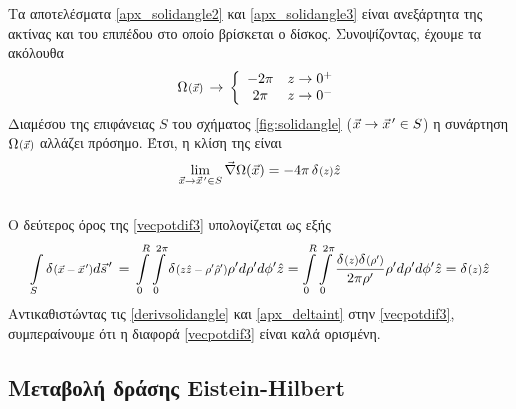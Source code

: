 Τα αποτελέσματα \eqref{apx_solidangle2} και \eqref{apx_solidangle3} είναι ανεξάρτητα της ακτίνας και του επιπέδου στο οποίο βρίσκεται ο δίσκος. 
Συνοψίζοντας, έχουμε τα ακόλουθα
\begin{equation*}
    \scafun{\Omega}{\vec{x}} \,\rightarrow\, \left\{\begin{array}{cc} -2\pi & z \rightarrow 0^+\\ 2\pi & z\rightarrow0^-
            \end{array} \right. 
\end{equation*}
Διαμέσου της επιφάνειας $S$ του σχήματος \ref{fig:solidangle} ($\vec{x}\rightarrow\pvec{x}'\in S$) η συνάρτηση $\scafun{\Omega}{\vec{x}}$ αλλάζει πρόσημο. Έτσι, η κλίση της είναι 
\begin{equation}\label{derivsolidangle}
    \lim\limits_{\vec{x}\rightarrow\pvec{x}'\in S} \vec{\nabla} \Omega(\vec{x}) = -4\pi \, \scafun{\delta}{z}\hat{z}
\end{equation}
\\
O δεύτερος όρος της \eqref{vecpotdif3} υπολογίζεται ως εξής
\begin{equation}\label{apx_deltaint}
    \int\limits_S  \scafun{\delta}{\vec{x}-\pvec{x}'} d\pvec{s}' \,=\, \int\limits_0^R\int\limits_0^{2\pi}\scafun{\delta}{z\hat{z}-\rho'\hat{\rho}'}\rho'd\rho'd\phi'\hat{z} = \int\limits_0^R\int\limits_0^{2\pi}\frac{\scafun{\delta}{z}\scafun{\delta}{\rho'}}{2\pi\rho'}\rho'd\rho'd\phi'\hat{z} = \scafun{\delta}{z}\hat{z}
\end{equation}
Αντικαθιστώντας τις \eqref{derivsolidangle} και \eqref{apx_deltaint} στην \eqref{vecpotdif3}, συμπεραίνουμε ότι η διαφορά \eqref{vecpotdif3} είναι καλά ορισμένη. 


\subsection{Μεταβολή δράσης Eistein-Hilbert}\label{EHvar}

